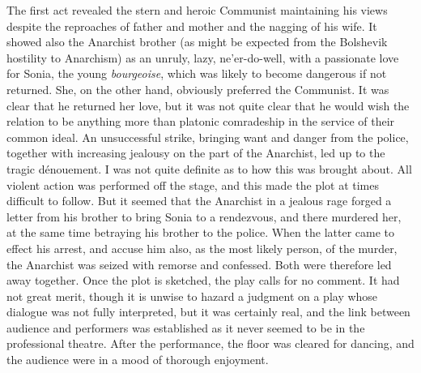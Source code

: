 The first act revealed the stern and heroic Communist maintaining his views despite the reproaches of father and mother and the nagging of his wife. It showed also the Anarchist brother (as might be expected from the Bolshevik hostility to Anarchism) as an unruly, lazy, ne'er-do-well, with a passionate love for Sonia, the young \emph{bourgeoise}, which was likely to become dangerous if not returned. She, on the other hand, obviously preferred the Communist. It was clear that he returned her love, but it was not quite clear that he would wish the relation to be anything more than platonic comradeship in the service of their common ideal. An unsuccessful strike, bringing want and danger from the police, together with increasing jealousy on the part of the Anarchist, led up to the tragic dénouement. I was not quite definite as to how this was brought about. All violent action was performed off the stage, and this made the plot at times difficult to follow. But it seemed that the Anarchist in a jealous rage forged a letter from his brother to bring Sonia to a rendezvous, and there murdered her, at the same time betraying his brother to the police. When the latter came to effect his arrest, and accuse him also, as the most likely person, of the murder, the Anarchist was seized with remorse and confessed. Both were therefore led away together. Once the plot is sketched, the play calls for no comment. It had not great merit, though it is unwise to hazard a judgment on a play whose dialogue was not fully interpreted, but it was certainly real, and the link between audience and performers was established as it never seemed to be in the professional theatre. After the performance, the floor was cleared for dancing, and the audience were in a mood of thorough enjoyment.

